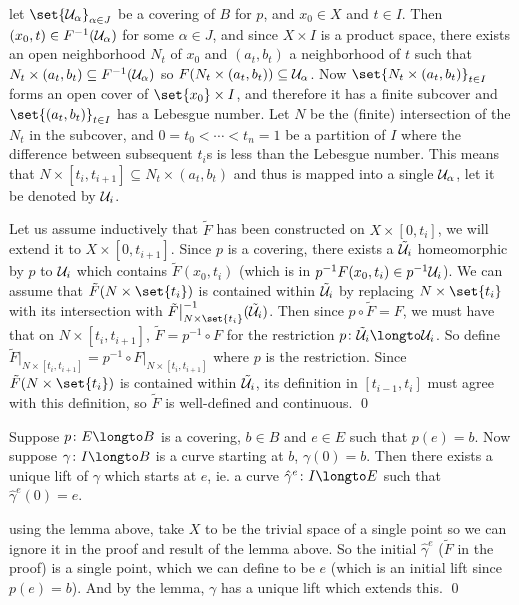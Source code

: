 \Proof let $\set{\U_\alpha}_{\alpha\in J}$ be a covering of $B$ for $p$, and $x_0\in X$ and $t\in I$.
Then $(x_0,t)\in F^{-1}({\cal U}_\alpha)$ for some $\alpha\in J$, and since $X\times I$ is a product space, there exists an open neighborhood $N_t$ of $x_0$ and $(a_t,b_t)$ a neighborhood of $t$ such that
$N_t\times(a_t,b_t)\subseteq F^{-1}({\cal U}_\alpha)$ so $F(N_t\times(a_t,b_t))\subseteq{\cal U}_\alpha$.
Now $\set{N_t\times(a_t,b_t)}_{t\in I}$ forms an open cover of $\set{x_0}\times I$, and therefore it has a finite subcover and $\set{(a_t,b_t)}_{t\in I}$ has a Lebesgue number.
Let $N$ be the (finite) intersection of the $N_t$ in the subcover, and $0=t_0<\cdots<t_n=1$ be a partition of $I$ where the difference between subsequent $t_i$s is less than the Lebesgue number.
This means that $N\times[t_i,t_{i+1}]\subseteq N_t\times(a_t,b_t)$ and thus is mapped into a single ${\cal U}_\alpha$, let it be denoted by ${\cal U}_i$.

Let us assume inductively that $\tilde F$ has been constructed on $X\times[0,t_i]$, we will extend it to $X\times[0,t_{i+1}]$.
Since $p$ is a covering, there exists a $\tilde{{\cal U}}_i$ homeomorphic by $p$ to ${\cal U}_i$ which contains $\tilde F(x_0,t_i)$ (which is in $p^{-1}F(x_0,t_i)\in p^{-1}{\cal U}_i$).
We can assume that $\tilde F(N\times\set{t_i})$ is contained within $\tilde{{\cal U}}_i$ by replacing $N\times\set{t_i}$ with its intersection with $\tilde F\bigl|_{N\times\set{t_i}}^{-1}(\tilde\U_i)$.
Then since $p\circ\tilde F=F$, we must have that on $N\times[t_i,t_{i+1}]$, $\tilde F=p^{-1}\circ F$ for the restriction $p\colon\tilde\U_i\longto\U_i$.
So define $\tilde F\bigl|_{N\times[t_i,t_{i+1}]}=p^{-1}\circ F\bigl|_{N\times[t_i,t_{i+1}]}$ where $p$ is the restriction.
Since $\tilde F(N\times\set{t_i})$ is contained within $\tilde{{\cal U}}_i$, its definition in $[t_{i-1},t_i]$ must agree with this definition, so $\tilde F$ is well-defined and continuous.
\qed

\bthrm

    Suppose $p\colon E\longto B$ is a covering, $b\in B$ and $e\in E$ such that $p(e)=b$.
    Now suppose $\gamma\colon I\longto B$ is a curve starting at $b$, $\gamma(0)=b$.
    Then there exists a unique lift of $\gamma$ which starts at $e$, ie. a curve $\hat\gamma^e\colon I\longto E$ such that $\hat\gamma^e(0)=e$.

\ethrm

\Proof using the lemma above, take $X$ to be the trivial space of a single point so we can ignore it in the proof and result of the lemma above.
So the initial $\hat\gamma^e$ ($\tilde F$ in the proof) is a single point, which we can define to be $e$ (which is an initial lift since $p(e)=b$).
And by the lemma, $\gamma$ has a unique lift which extends this.
\qed

